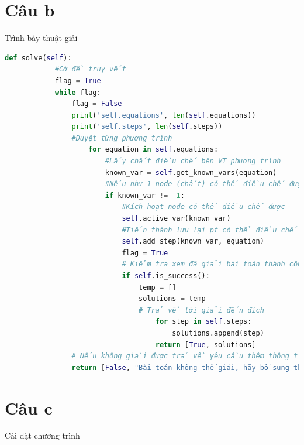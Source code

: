 \documentclass[a4paper]{article}
\begin{document}
	\section*{Câu b}
	Trình bày thuật giải
	\begin{lstlisting}[language=Python, caption=Thuật giải mạng ngữ nghĩa điều chế]
		def solve(self):
			#Cờ đề truy vết
			flag = True
			while flag:
				flag = False
				print('self.equations', len(self.equations))
				print('self.steps', len(self.steps))
				#Duyệt từng phương trình
					for equation in self.equations:
						#Lấy chất điều chế bên VT phương trình
						known_var = self.get_known_vars(equation)
						#Nếu như 1 node (chất) có thể điều chế được (khác -1)
						if known_var != -1:
							#Kích hoạt node có thể điều chế được
							self.active_var(known_var)
							#Tiến thành lưu lại pt có thể điều chế
							self.add_step(known_var, equation)
							flag = True
							# Kiểm tra xem đã giải bài toán thành công chưa?
							if self.is_success():
								temp = []
								solutions = temp
								# Trả về lời giải đến đích
									for step in self.steps:
										solutions.append(step)
									return [True, solutions]
				# Nếu không giải được trả về yêu cầu thêm thông tin, tri thức
				return [False, "Bài toán không thể giải, hãy bổ sung thêm thông tin hoặc tri thức."]
	\end{lstlisting}
	
	\section*{Câu c}
	Cài đặt chương trình
\end{document}
